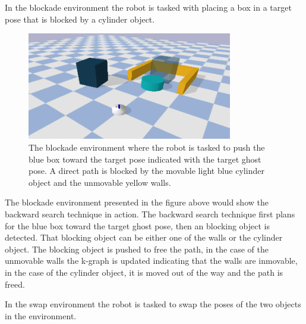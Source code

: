 In the blockade environment the robot is tasked with placing a box in a target pose that is blocked by a cylinder object.\bs
\begin{figure}[H]
  \centering
  \includegraphics[width=0.8\textwidth]{figures/results/blockade}
  \caption{The blockade environment where the robot is tasked to push the blue box toward the target pose indicated with the target ghost pose. A direct path is blocked by the movable light blue cylinder object and the unmovable yellow walls.}%
  \label{fig:benchmark_blockade}
\end{figure}

The blockade environment presented in the figure above would show the backward search technique in action. The backward search technique first plans for the blue box toward the target ghost pose, then an blocking object is detected. That blocking object can be either one of the walls or the cylinder object. The blocking object is pushed to free the path, in the case of the unmovable walls the \ac{k-graph} is updated indicating that the walls are inmovable, in the case of the cylinder object, it is moved out of the way and the path is freed.\bs

In the swap environment the robot is tasked to swap the poses of the two objects in the environment.\bs


